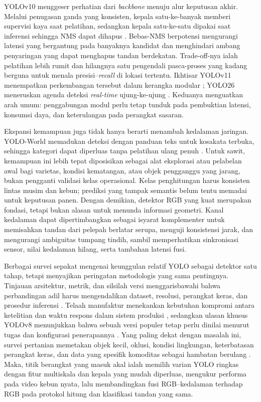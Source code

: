 YOLOv10 menggeser perhatian dari \textit{backbone} menuju alur keputusan akhir. Melalui penugasan ganda yang konsisten, kepala satu-ke-banyak memberi supervisi kaya saat pelatihan, sedangkan kepala satu-ke-satu dipakai saat inferensi sehingga NMS dapat dihapus \cite{wang2024yolov10}. Bebas-NMS berpotensi mengurangi latensi yang bergantung pada banyaknya kandidat dan menghindari ambang penyaringan yang dapat menghapus tandan berdekatan. Trade-off-nya ialah pelatihan lebih rumit dan hilangnya satu pengendali pasca-proses yang kadang berguna untuk menala presisi--\textit{recall} di lokasi tertentu. Ikhtisar YOLOv11 menempatkan perkembangan tersebut dalam kerangka modular \cite{khanam2024yolov11}; YOLO26 meneruskan agenda deteksi \textit{real-time} ujung-ke-ujung \cite{sapkota2025yolo26}. Keduanya menguatkan arah umum: penggabungan modul perlu tetap tunduk pada pembuktian latensi, konsumsi daya, dan keterulangan pada perangkat sasaran.

Ekspansi kemampuan juga tidak hanya berarti menambah kedalaman jaringan. YOLO-World memadukan deteksi dengan panduan teks untuk kosakata terbuka, sehingga kategori dapat diperluas tanpa pelatihan ulang penuh \cite{cheng2024yoloworld}. Untuk sawit, kemampuan ini lebih tepat diposisikan sebagai alat eksplorasi atau pelabelan awal bagi varietas, kondisi kematangan, atau objek pengganggu yang jarang, bukan pengganti validasi kelas operasional. Kelas penghitungan harus konsisten lintas musim dan kebun; prediksi yang tampak semantis belum tentu memadai untuk keputusan panen. Dengan demikian, detektor RGB yang kuat merupakan fondasi, tetapi bukan alasan untuk menunda informasi geometri. Kanal kedalaman dapat dipertimbangkan sebagai isyarat komplementer untuk memisahkan tandan dari pelepah berlatar serupa, menguji konsistensi jarak, dan mengurangi ambiguitas tumpang tindih, sambil memperhatikan sinkronisasi sensor, nilai kedalaman hilang, serta tambahan latensi fusi.

Berbagai survei sepakat mengenai keunggulan relatif YOLO sebagai detektor satu tahap, tetapi menyajikan peringatan metodologis yang sama pentingnya. Tinjauan arsitektur, metrik, dan silsilah versi menggarisbawahi bahwa perbandingan adil harus mengendalikan dataset, resolusi, perangkat keras, dan prosedur inferensi \cite{terven2023yolo,jiang2022yoloreview,sapkota2025yologenesis,vijayakumar2024yolo,alif2024yoloevolution,diwan2023yolo}. Telaah manufaktur menekankan kebutuhan kompromi antara ketelitian dan waktu respons dalam sistem produksi \cite{hussain2023yolo}, sedangkan ulasan khusus YOLOv8 menunjukkan bahwa sebuah versi populer tetap perlu dinilai menurut tugas dan konfigurasi penerapannya \cite{sohan2024yolov8review}. Yang paling dekat dengan masalah ini, survei pertanian memetakan objek kecil, oklusi, kondisi lingkungan, keterbatasan perangkat keras, dan data yang spesifik komoditas sebagai hambatan berulang \cite{sapkota2024yoloagri}. Maka, titik berangkat yang masuk akal ialah memilih varian YOLO ringkas dengan fitur multiskala dan kepala yang mudah diperluas, mengukur performa pada video kebun nyata, lalu membandingkan fusi RGB--kedalaman terhadap RGB pada protokol hitung dan klasifikasi tandan yang sama.

